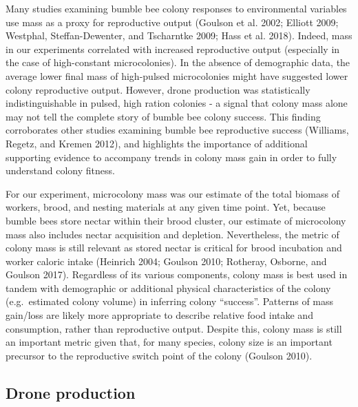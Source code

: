 \documentclass[11pt,]{article}
\begin{document}
Many studies examining bumble bee colony responses to environmental
variables use mass as a proxy for reproductive output (Goulson et al.
2002; Elliott 2009; Westphal, Steffan-Dewenter, and Tscharntke 2009;
Hass et al. 2018). Indeed, mass in our experiments correlated with
increased reproductive output (especially in the case of high-constant
microcolonies). In the absence of demographic data, the average lower
final mass of high-pulsed microcolonies might have suggested lower
colony reproductive output. However, drone production was statistically
indistinguishable in pulsed, high ration colonies - a signal that colony
mass alone may not tell the complete story of bumble bee colony success.
This finding corroborates other studies examining bumble bee
reproductive success (Williams, Regetz, and Kremen 2012), and highlights
the importance of additional supporting evidence to accompany trends in
colony mass gain in order to fully understand colony fitness.

For our experiment, microcolony mass was our estimate of the total
biomass of workers, brood, and nesting materials at any given time
point. Yet, because bumble bees store nectar within their brood cluster,
our estimate of microcolony mass also includes nectar acquisition and
depletion. Nevertheless, the metric of colony mass is still relevant as
stored nectar is critical for brood incubation and worker caloric intake
(Heinrich 2004; Goulson 2010; Rotheray, Osborne, and Goulson 2017).
Regardless of its various components, colony mass is best used in tandem
with demographic or additional physical characteristics of the colony
(e.g.~estimated colony volume) in inferring colony ``success''. Patterns
of mass gain/loss are likely more appropriate to describe relative food
intake and consumption, rather than reproductive output. Despite this,
colony mass is still an important metric given that, for many species,
colony size is an important precursor to the reproductive switch point
of the colony (Goulson 2010).

\hypertarget{drone-production}{%
\subsection{Drone production}\label{drone-production}}
\end{document}

